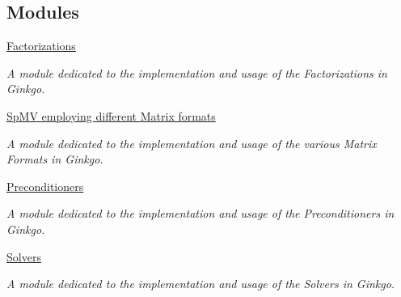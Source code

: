 \subsection*{Modules}
\begin{DoxyCompactItemize}
\item 
\hyperlink{group__factor}{Factorizations}
\begin{DoxyCompactList}\small\item\em A module dedicated to the implementation and usage of the Factorizations in Ginkgo. \end{DoxyCompactList}\item 
\hyperlink{group__mat__formats}{Sp\+M\+V employing different Matrix formats}
\begin{DoxyCompactList}\small\item\em A module dedicated to the implementation and usage of the various Matrix Formats in Ginkgo. \end{DoxyCompactList}\item 
\hyperlink{group__precond}{Preconditioners}
\begin{DoxyCompactList}\small\item\em A module dedicated to the implementation and usage of the Preconditioners in Ginkgo. \end{DoxyCompactList}\item 
\hyperlink{group__solvers}{Solvers}
\begin{DoxyCompactList}\small\item\em A module dedicated to the implementation and usage of the Solvers in Ginkgo. \end{DoxyCompactList}\end{DoxyCompactItemize}
